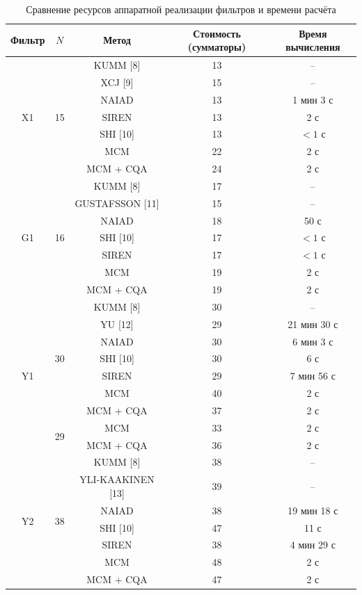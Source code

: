 \begin{table}[htbp]
	\centering
	\caption{Сравнение ресурсов аппаратной реализации фильтров и времени расчёта}
	\label{tab:resource_comparison}
	\begin{tabular}{|c|c|c|c|c|}
		\hline
		Фильтр & $N$ & Метод & Стоимость (сумматоры) & Время вычисления \\
		\hline
		
		\multirow{7}{*}{X1} 
		& \multirow{7}{*}{15}
		& KUMM [8]        & 13 & -- \\
		& & XCJ [9]       & 15 & -- \\
		& & NAIAD         & 13 & 1 мин 3 с \\
		& & SIREN         & 13 & 2 с \\
		& & SHI [10]      & 13 & $<1$ с \\
		& & MCM           & 22 & 2 с \\
		& & MCM + CQA     & 24 & 2 с \\
		\hline
		
		\multirow{7}{*}{G1}
		& \multirow{7}{*}{16}
		& KUMM [8]            & 17 & -- \\
		& & GUSTAFSSON [11]   & 15 & -- \\
		& & NAIAD             & 18 & 50 с \\
		& & SHI [10]          & 17 & $<1$ с \\
		& & SIREN             & 17 & $<1$ с \\
		& & MCM               & 19 & 2 с \\
		& & MCM + CQA         & 19 & 2 с \\
		\hline
		
		\multirow{9}{*}{Y1}
		& \multirow{7}{*}{30}
		& KUMM [8]        & 30 & -- \\
		& & YU [12]       & 29 & 21 мин 30 с \\
		& & NAIAD         & 30 & 6 мин 3 с \\
		& & SHI [10]      & 30 & 6 с \\
		& & SIREN         & 29 & 7 мин 56 с \\
		& & MCM           & 40 & 2 с \\
		& & MCM + CQA     & 37 & 2 с \\
		\cline{2-5}
		& \multirow{2}{*}{29}
		& MCM           & 33 & 2 с \\
		& & MCM + CQA   & 36 & 2 с \\
		\hline
		
		\multirow{7}{*}{Y2}
		& \multirow{7}{*}{38}
		& KUMM [8]              & 38 & -- \\
		& & YLI-KAAKINEN [13]   & 39 & -- \\
		& & NAIAD               & 38 & 19 мин 18 с \\
		& & SHI [10]            & 47 & 11 с \\
		& & SIREN               & 38 & 4 мин 29 с \\
		& & MCM                 & 48 & 2 с \\
		& & MCM + CQA           & 47 & 2 с \\
		\hline
		

\end{tabular}
\end{table}
